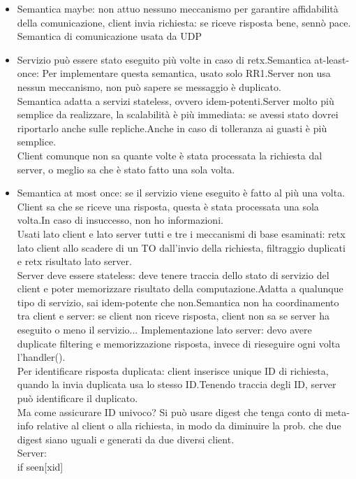 \documentclass{article}
\begin{document}
\begin{itemize}
\item Semantica maybe: non attuo nessuno meccanismo per garantire affidabilità della comunicazione, client invia richiesta: se riceve risposta bene, sennò pace. Semantica di comunicazione usata da UDP
\item Servizio può essere stato eseguito più volte in caso di retx.Semantica at-least-once: Per implementare questa semantica, usato solo RR1.Server non usa nessun meccanismo, non può sapere se messaggio è duplicato.\\Semantica adatta a servizi stateless, ovvero idem-potenti.Server molto più semplice da realizzare, la scalabilità è più immediata: se avessi stato dovrei riportarlo anche sulle repliche.Anche in caso di tolleranza ai guasti è più semplice.\\Client comunque non sa quante volte è stata processata la richiesta dal server, o meglio sa che è stato fatto una sola volta.
\item Semantica at most once: se il servizio viene eseguito è fatto al più una volta. Client sa che se riceve una risposta, questa è stata processata una sola volta.In caso di insuccesso, non ho informazioni.\\Usati lato client e lato server tutti e tre i meccanismi di base esaminati: retx lato client allo scadere di un TO dall'invio della richiesta, filtraggio duplicati e retx risultato lato server.\\Server deve essere stateless: deve tenere traccia dello stato di servizio del client e poter memorizzare risultato della computazione.Adatta a qualunque tipo di servizio, sai idem-potente che non.Semantica non ha coordinamento tra client e server: se client non riceve risposta, client non sa se server ha eseguito o meno il servizio...
Implementazione lato server: devo avere duplicate filtering e memorizzazione risposta, invece di rieseguire ogni volta l'handler().\\Per identificare risposta duplicata: client inserisce unique ID di richiesta, quando la invia duplicata usa lo stesso ID.Tenendo traccia degli ID, server può identificare il duplicato.\\Ma come assicurare ID univoco? Si può usare digest che tenga conto di meta-info relative al client o alla richiesta, in modo da diminuire la prob. che due digest siano uguali e generati da due diversi client.\\Server:\\
if seen[xid]\\

\end{itemize}
\end{document}

